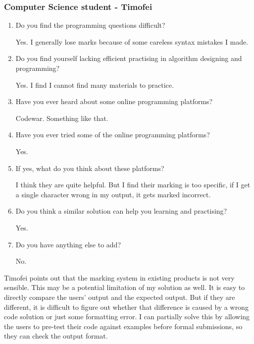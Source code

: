 \documentclass[a4paper]{report}
\begin{document}
\subsubsection{Computer Science student - Timofei}

\begin{enumerate}

    \item Do you find the programming questions difficult?

    Yes. I generally lose marks because of some careless syntax mistakes I made.

    \item Do you find yourself lacking efficient practising in algorithm designing and programming?

    Yes. I find I cannot find many materials to practice.

    \item Have you ever heard about some online programming platforms?

    Codewar. Something like that.

    \item Have you ever tried some of the online programming platforms?

    Yes.

    \item If yes, what do you think about these platforms?

    I think they are quite helpful. But I find their marking is too specific, if I get a single character wrong in my output, it gets marked incorrect.

    \item Do you think a similar solution can help you learning and practising?

    Yes.

    \item Do you have anything else to add?

    No.

\end{enumerate}

Timofei points out that the marking system in existing products is not very sensible. This may be a potential limitation of my solution as well. It is easy to directly compare the users' output and the expected output. But if they are different, it is difficult to figure out whether that difference is caused by a wrong code solution or just some formatting error. I can partially solve this by allowing the users to pre-test their code against examples before formal submissions, so they can check the output format.
\end{document}
